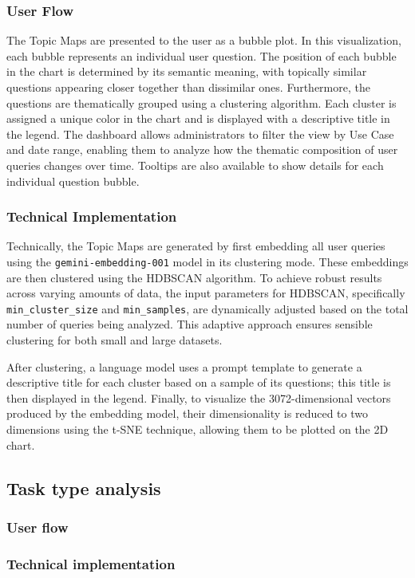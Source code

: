 \documentclass[
	english,
	ruledheaders=section,%
	class=report,%
	thesis={type=bachelor},%
	accentcolor=1b,%
	custommargins=true,%
	marginpar=false,%
	parskip=half-,%
	fontsize=11pt,%
	DIV=14,
]{tudapub}
\begin{document}
\subsubsection{User Flow}
The Topic Maps are presented to the user as a bubble plot. In this visualization, each bubble represents an individual user question. The position of each bubble in the chart is determined by its semantic meaning, with topically similar questions appearing closer together than dissimilar ones. Furthermore, the questions are thematically grouped using a clustering algorithm. Each cluster is assigned a unique color in the chart and is displayed with a descriptive title in the legend. The dashboard allows administrators to filter the view by Use Case and date range, enabling them to analyze how the thematic composition of user queries changes over time. Tooltips are also available to show details for each individual question bubble.

\subsubsection{Technical Implementation}
Technically, the Topic Maps are generated by first embedding all user queries using the \texttt{gemini-embedding-001} model in its clustering mode. These embeddings are then clustered using the HDBSCAN algorithm. To achieve robust results across varying amounts of data, the input parameters for HDBSCAN, specifically \texttt{min\_cluster\_size} and \texttt{min\_samples}, are dynamically adjusted based on the total number of queries being analyzed. This adaptive approach ensures sensible clustering for both small and large datasets.

After clustering, a language model uses a prompt template to generate a descriptive title for each cluster based on a sample of its questions; this title is then displayed in the legend. Finally, to visualize the 3072-dimensional vectors produced by the embedding model, their dimensionality is reduced to two dimensions using the t-SNE technique, allowing them to be plotted on the 2D chart.
\subsection{Task type analysis}
\subsubsection{User flow}
\subsubsection{Technical implementation}
\end{document}

